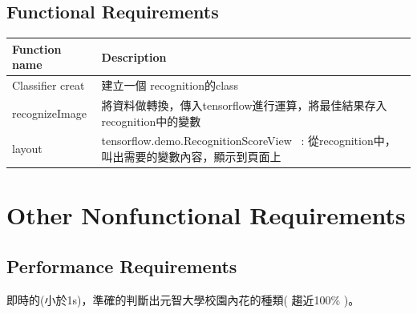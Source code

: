 \documentclass{scrreprt}
\begin{document}
\section{Functional Requirements}
\begin{center}
	\begin{CJK}{UTF8}{bkai}
		
		\begin{tabular}{| l | l |}
		\hline
			\rowcolor{gray}Function name & Description \\ \hline
			Classifier creat &   建立一個 recognition的class \\ \hline
			recognizeImage & 將資料做轉換，傳入tensorflow進行運算，將最佳結果存入recognition中的變數 \\ \hline
			layout & tensorflow.demo.RecognitionScoreView \ : 從recognition中，叫出需要的變數內容，顯示到頁面上 \\ \hline
		\end{tabular}
	\end{CJK}
\end{center}


\chapter{Other Nonfunctional Requirements}

\section{Performance Requirements}
\begin{CJK}{UTF8}{bkai}
	即時的(小於1s)，準確的判斷出元智大學校園內花的種類( 趨近100\% )。
\end{CJK}
\end{document}
